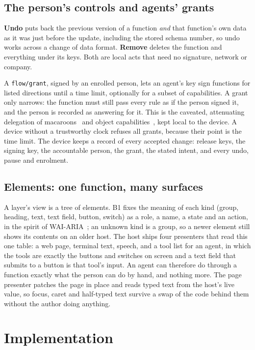 \documentclass[10pt,twocolumn]{article}
\newcommand{\code}[1]{\texttt{#1}}
\begin{document}
\subsection{The person's controls and agents' grants}

\textbf{Undo} puts back the previous version of a function \emph{and} that function's own data as it
was just before the update, including the stored schema number, so undo works across a change of
data format. \textbf{Remove} deletes the function and everything under its keys. Both are local acts
that need no signature, network or company.

A \code{flow/grant}, signed by an enrolled person, lets an agent's key sign functions for listed
directions until a time limit, optionally for a subset of capabilities. A grant only narrows: the
function must still pass every rule as if the person signed it, and the person is recorded as
answering for it. This is the caveated, attenuating delegation of macaroons~\cite{birgisson2014macaroons}
and object capabilities~\cite{miller2006robust}, kept local to the device. A device without a
trustworthy clock refuses all grants, because their point is the time limit. The device keeps a
record of every accepted change: release keys, the signing key, the accountable person, the grant,
the stated intent, and every undo, pause and enrolment.

\subsection{Elements: one function, many surfaces}

A layer's view is a tree of elements. B1 fixes the meaning of each kind (group, heading, text, text
field, button, switch) as a role, a name, a state and an action, in the spirit of
WAI-ARIA~\cite{wcagaria}; an unknown kind is a group, so a newer element still shows its contents on
an older host. The host ships four presenters that read this one table: a web page, terminal text,
speech, and a tool list for an agent, in which the tools are exactly the buttons and switches on
screen and a text field that submits to a button is that tool's input. An agent can therefore do
through a function exactly what the person can do by hand, and nothing more. The page presenter
patches the page in place and reads typed text from the host's live value, so focus, caret and
half-typed text survive a swap of the code behind them without the author doing anything.

\section{Implementation}
\label{sec:impl}
\end{document}
